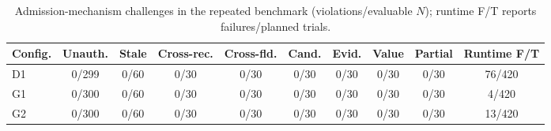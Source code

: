 \begin{table}[t]
\centering
\footnotesize
\caption{Admission-mechanism challenges in the repeated benchmark (violations/evaluable $N$); runtime F/T reports failures/planned trials.}
\label{tab:admission-mechanism-final}
\setlength{\tabcolsep}{3pt}
\begin{tabular*}{\textwidth}{@{\extracolsep{\fill}}lccccccccc@{}}
\toprule
Config. & Unauth. & Stale & Cross-rec. & Cross-fld. & Cand. & Evid. & Value & Partial & Runtime F/T \\
\midrule
D1 & 0/299 & 0/60 & 0/30 & 0/30 & 0/30 & 0/30 & 0/30 & 0/30 & 76/420 \\
G1 & 0/300 & 0/60 & 0/30 & 0/30 & 0/30 & 0/30 & 0/30 & 0/30 & 4/420 \\
G2 & 0/300 & 0/60 & 0/30 & 0/30 & 0/30 & 0/30 & 0/30 & 0/30 & 13/420 \\
\bottomrule
\end{tabular*}
\end{table}
